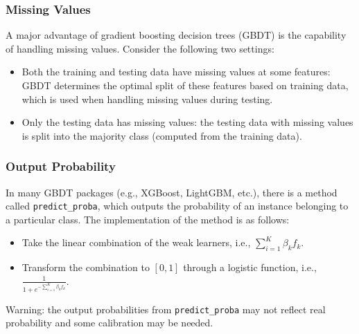 {        
        
    \subsubsection{Missing Values}
        A major advantage of gradient boosting decision trees (GBDT) is the capability of handling missing values.
        Consider the following two settings:
            \begin{itemize}
                \item Both the training and testing data have missing values at some features: GBDT determines the optimal split of these features based on training data, which is used when handling missing values during testing.
                \item Only the testing data has missing values: the testing data with missing values is split into the majority class (computed from the training data).
            \end{itemize}

    \subsubsection{Output Probability}
        In many GBDT packages (e.g., XGBoost, LightGBM, etc.), there is a method called \texttt{predict\_proba}, which outputs the probability of an instance belonging to a particular class.
        The implementation of the method is as follows:
        \begin{itemize}
            \item Take the linear combination of the weak learners, i.e., $\sum_{i=1}^{K}{\beta_k f_k}$.
            \item Transform the combination to $[0, 1]$ through a logistic function, i.e., $\frac{1}{1 + e^{-\sum_{i=1}^{K}{\beta_k f_k}}}$.
        \end{itemize}
    Warning: the output probabilities from \texttt{predict\_proba} may not reflect real probability and some calibration may be needed.

}

